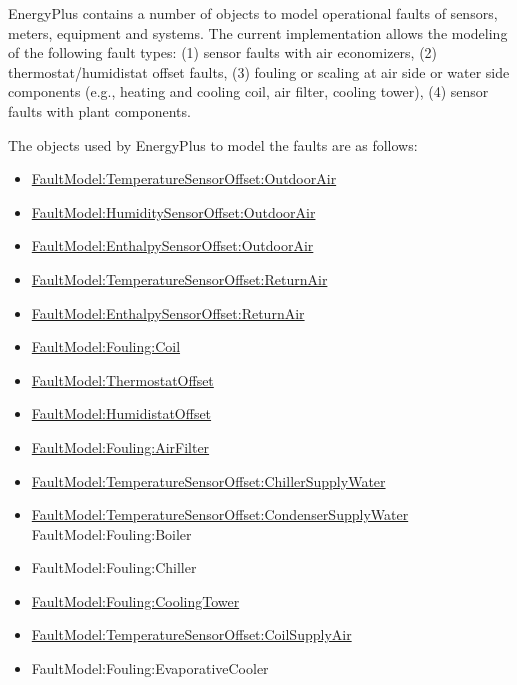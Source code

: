 EnergyPlus contains a number of objects to model operational faults of sensors, meters, equipment and systems. The current implementation allows the modeling of the following fault types: (1) sensor faults with air economizers, (2) thermostat/humidistat offset faults, (3) fouling or scaling at air side or water side components (e.g., heating and cooling coil, air filter, cooling tower), (4) sensor faults with plant components.

The objects used by EnergyPlus to model the faults are as follows:

\begin{itemize}
\item
  \hyperref[faultmodeltemperaturesensoroffsetoutdoorair]{FaultModel:TemperatureSensorOffset:OutdoorAir}
\item
  \hyperref[faultmodelhumiditysensoroffsetoutdoorair]{FaultModel:HumiditySensorOffset:OutdoorAir}
\item
  \hyperref[faultmodelenthalpysensoroffsetoutdoorair]{FaultModel:EnthalpySensorOffset:OutdoorAir}
\item
  \hyperref[faultmodeltemperaturesensoroffsetreturnair]{FaultModel:TemperatureSensorOffset:ReturnAir}
\item
  \hyperref[faultmodelenthalpysensoroffsetreturnair]{FaultModel:EnthalpySensorOffset:ReturnAir}
\item
  \hyperref[faultmodelfoulingcoil]{FaultModel:Fouling:Coil}
\item
  \hyperref[faultmodelthermostatoffset]{FaultModel:ThermostatOffset}
\item
  \hyperref[faultmodelhumidistatoffset]{FaultModel:HumidistatOffset}
\item
  \hyperref[faultmodelfoulingairfilter]{FaultModel:Fouling:AirFilter}
\item
  \hyperref[faultmodeltemperaturesensoroffsetchillersupplywater]{FaultModel:TemperatureSensorOffset:ChillerSupplyWater}
\item
  \hyperref[faultmodeltemperaturesensoroffsetcondensersupplywater]{FaultModel:TemperatureSensorOffset:CondenserSupplyWater}
  FaultModel:Fouling:Boiler
\item
  FaultModel:Fouling:Chiller
\item
  \hyperref[faultmodelfoulingcoolingtower]{FaultModel:Fouling:CoolingTower}
\item
  \hyperref[faultmodeltemperaturesensoroffsetcoilsupplyair]{FaultModel:TemperatureSensorOffset:CoilSupplyAir}
\item
  FaultModel:Fouling:EvaporativeCooler
\end{itemize}

